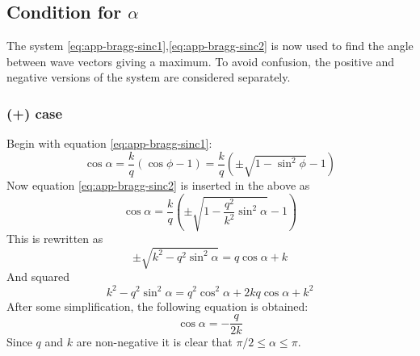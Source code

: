 \documentclass[11pt,twoside]{eitExjobb}
\begin{document}
	\subsection{Condition for $\alpha$}
	The system \eqref{eq:app-bragg-sinc1},\eqref{eq:app-bragg-sinc2} is now used to find the angle between wave vectors giving a maximum. To avoid confusion, the positive and negative versions of the system are considered separately.
	
	\subsubsection{(+) case}
	Begin with equation \eqref{eq:app-bragg-sinc1}:
	\begin{equation*}
		\cos{\alpha} = \frac{k}{q}\left( \cos{\phi} - 1 \right) = \frac{k}{q}\left( \pm \sqrt{1-\sin^2{\phi}} - 1 \right)
	\end{equation*}
	Now equation \eqref{eq:app-bragg-sinc2} is inserted in the above as
	\begin{equation*}
		\cos{\alpha} = \frac{k}{q}\left( \pm \sqrt{1-\frac{q^2}{k^2}\sin^2{\alpha}} - 1 \right)
	\end{equation*}
	This is rewritten as
	\begin{equation*}
		\pm \sqrt{k^2-q^2\sin^2{\alpha}} = q\cos{\alpha} + k
	\end{equation*}
	And squared
	\begin{equation*}
		k^2 - q^2\sin^2{\alpha} = q^2\cos^2{\alpha} + 2kq\cos{\alpha} + k^2
	\end{equation*}
	After some simplification, the following equation is obtained:
	\begin{equation}
		\cos{\alpha} = -\frac{q}{2k} \label{eq:app-bragg-cos+}
	\end{equation}
	Since $q$ and $k$ are non-negative it is clear that $\pi/2 \leq \alpha \leq \pi$.
	
\end{document}
